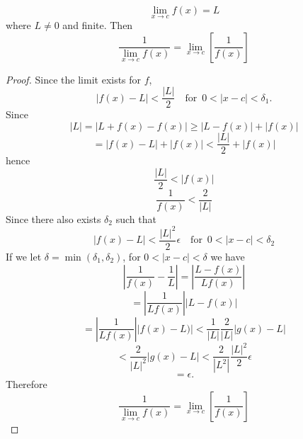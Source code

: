 \documentclass[11pt]{article}
\numberwithin{lemma}{section}
\numberwithin{equation}{section}
\numberwithin{define}{section}
\numberwithin{prop}{section}
\numberwithin{figure}{section}
\numberwithin{theorem}{section}
\numberwithin{cor}{section}
\newcounter{ex}[section]
\numberwithin{ex}{section}
\def\sbrak#1{\left[#1\right]}
\def\abs#1{\left\lvert #1 \right\rvert}
\def\for{\quad\text{for }\,}
\begin{document}
\begin{theorem}
	$$\lim_{x\to c}f(x)=L$$
where $L\neq0$ and finite. Then
$$\frac{1}{\lim_{x\to c}f(x)}=\lim_{x\to c}\sbrak{\frac{1}{f(x)}}$$
\end{theorem}
\begin{proof}
	Since the limit exists for $f$,
	$$|f(x)-L|<\frac{|L|}{2} \for 0<|x-c|<\delta_1.$$
	Since
	$$|L|=|L+f(x)-f(x)|\ge |L-f(x)|+|f(x)|$$
	$$=|f(x)-L|+|f(x)|<\frac{|L|}{2}+|f(x)|$$
	hence
	$$\frac{|L|}{2}<|f(x)|$$
	$$\frac{1}{f(x)}<\frac{2}{|L|}$$
	Since there also exists $\delta_2$ such that
	$$|f(x)-L|<\frac{|L|^2}{2} \epsilon \for 0 <|x-c|<\delta_2$$
	If we let $\delta=\min(\delta_1,\delta_2)$, for $0<|x-c|<\delta$ we have
	$$|\frac{1}{f(x)}-\frac{1}{L}|=|\frac{L-f(x)}{Lf(x)}|$$
	$$=\abs{\frac{1}{Lf(x)}}|L-f(x)|$$
	$$=\abs{\frac{1}{Lf(x)}}|f(x)-L)|<\frac{1}{|L|}\frac{2}{|L|}|g(x)-L|$$
	$$<\frac{2}{|L|^2}|g(x)-L|<\frac{2}{|L^2|}\frac{|L|^2}{2}\epsilon$$
	$$=\epsilon.$$
	Therefore
	$$\frac{1}{\lim_{x\to c}f(x)}=\lim_{x\to c}\sbrak{\frac{1}{f(x)}}$$
\end{proof}
\end{document}
